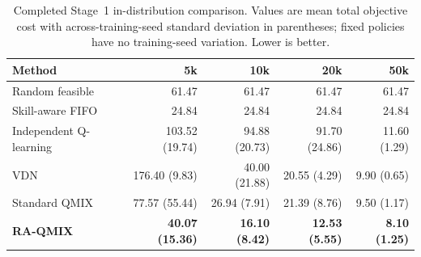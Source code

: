 \documentclass[11pt]{article}
\begin{document}
\begin{table}[H]
\centering
\small
\caption{Completed Stage~1 in-distribution comparison. Values are mean total objective cost with across-training-seed standard deviation in parentheses; fixed policies have no training-seed variation. Lower is better.}
\label{tab:stage1-learning-curves}
\begin{tabular}{lrrrr}
\toprule
Method & 5k & 10k & 20k & 50k \\
\midrule
Random feasible & 61.47 & 61.47 & 61.47 & 61.47 \\
Skill-aware FIFO & 24.84 & 24.84 & 24.84 & 24.84 \\
Independent Q-learning & 103.52 (19.74) & 94.88 (20.73) & 91.70 (24.86) & 11.60 (1.29) \\
VDN & 176.40 (9.83) & 40.00 (21.88) & 20.55 (4.29) & 9.90 (0.65) \\
Standard QMIX & 77.57 (55.44) & 26.94 (7.91) & 21.39 (8.76) & 9.50 (1.17) \\
\textbf{RA-QMIX} & \textbf{40.07 (15.36)} & \textbf{16.10 (8.42)} & \textbf{12.53 (5.55)} & \textbf{8.10 (1.25)} \\
\bottomrule
\end{tabular}
\end{table}
\end{document}

